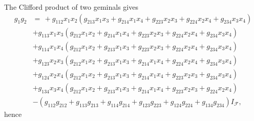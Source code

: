 \documentclass[aps,preprint]{revtex4}%
\begin{document}
The Clifford product of two geminals gives
\begin{align}
g_{1}g_{2}  &  =\,+\mathit{g}_{112}x_{1}x_{2}\left(  \mathit{g}_{213}%
x_{1}x_{3}+\mathit{g}_{214}x_{1}x_{4}+\mathit{g}_{223}x_{2}x_{3}%
+\mathit{g}_{224}x_{2}x_{4}+\mathit{g}_{234}x_{3}x_{4}\right) \\
&  +\mathit{g}_{113}x_{1}x_{3}\left(  \mathit{g}_{212}x_{1}x_{2}%
+\mathit{g}_{214}x_{1}x_{4}+\mathit{g}_{223}x_{2}x_{3}+\mathit{g}_{224}%
x_{2}x_{4}+\mathit{g}_{234}x_{3}x_{4}\right) \\
&  +\mathit{g}_{114}x_{1}x_{4}\left(  \mathit{g}_{212}x_{1}x_{2}%
+\mathit{g}_{213}x_{1}x_{3}+\mathit{g}_{223}x_{2}x_{3}+\mathit{g}_{224}%
x_{2}x_{4}+\mathit{g}_{234}x_{3}x_{4}\right) \\
&  +\mathit{g}_{123}x_{2}x_{3}\left(  \mathit{g}_{212}x_{1}x_{2}%
+\mathit{g}_{213}x_{1}x_{3}+\mathit{g}_{214}x_{1}x_{4}+\mathit{g}_{224}%
x_{2}x_{4}+\mathit{g}_{234}x_{3}x_{4}\right) \\
&  +\mathit{g}_{124}x_{2}x_{4}\left(  \mathit{g}_{212}x_{1}x_{2}%
+\mathit{g}_{213}x_{1}x_{3}+\mathit{g}_{214}x_{1}x_{4}+\mathit{g}_{223}%
x_{2}x_{3}+\mathit{g}_{234}x_{3}x_{4}\right) \\
&  +\mathit{g}_{134}x_{3}x_{4}\left(  \mathit{g}_{212}x_{1}x_{2}%
+\mathit{g}_{213}x_{1}x_{3}+\mathit{g}_{214}x_{1}x_{4}+\mathit{g}_{223}%
x_{2}x_{3}+\mathit{g}_{224}x_{2}x_{4}\right) \\
&  -\left(  \mathit{g}_{112}\mathit{g}_{212}+\mathit{g}_{113}\mathit{g}%
_{213}+\mathit{g}_{114}\mathit{g}_{214}+\mathit{g}_{123}\mathit{g}%
_{223}+\mathit{g}_{124}\mathit{g}_{224}+\mathit{g}_{134}\mathit{g}%
_{234}\right)  I_{\mathcal{F}},
\end{align}
hence%
\end{document}
